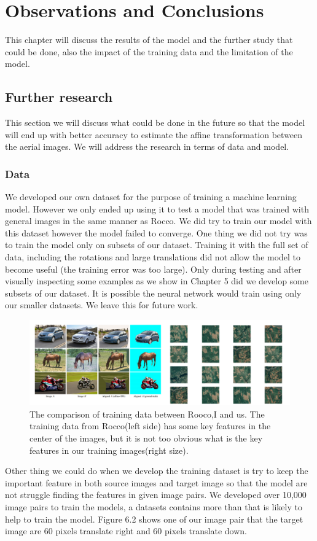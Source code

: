 \chapter{Observations and Conclusions}
This chapter will discuss the results of the model and the further study that could be done, also the impact of the training data and the limitation of the model.

 \section{Further research}
 This section we will discuss what could be done in the future so that the model will end up with better accuracy to estimate the affine transformation between the aerial images. We will address the research in terms of data and model.
\subsection{Data}
 We developed our own dataset for the purpose of training a machine learning model. However we only ended up using it to test a model that was trained with general images in the same manner as Rocco\cite{Rocco17}. We did try to train our model with this dataset however the model failed to converge. One thing we did not try was to train the model only on subsets of our dataset. Training it with the full set of data, including the rotations and large translations did not allow the model to become useful (the training error was too large). Only during testing and after visually inspecting some examples as we show in Chapter 5 did we develop some subsets of our dataset. It is possible the neural network would train using only our smaller datasets. We leave this for future work.\\
\begin{figure}
\centering
\includegraphics[width = 5.0in]{figs/data_compare}
\caption{The comparison of training data between Rooco,I\citep{Rocco17} and us. The training data from Rocco\citep{Rocco17}(left side) has some key features in the center of the images, but it is not too obvious what is the key features in our training images(right size).}
\end{figure}
 Other thing we could do when we develop the training dataset is try to keep the important feature in both source images and target image so that the model are not struggle finding the features in given image pairs. We developed over 10,000 image pairs to train the models, a datasets contains more than that is likely to help to train the model.
 Figure 6.2 shows one of our image pair that the target image are 60 pixels translate right and 60 pixels translate down.\\

